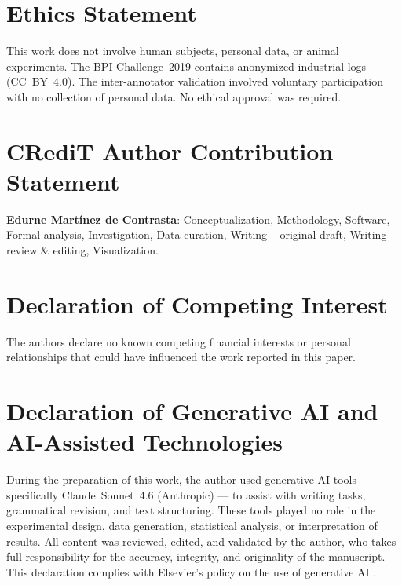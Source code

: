 \documentclass[preprint,12pt,numrefs]{elsarticle}
\begin{document}
\section*{Ethics Statement}
This work does not involve human subjects, personal data, or animal
experiments. The BPI Challenge~2019 contains anonymized industrial
logs (CC~BY~4.0). The inter-annotator validation involved voluntary
participation with no collection of personal data. No ethical approval
was required.

\section*{CRediT Author Contribution Statement}
\textbf{Edurne Martínez de Contrasta}: Conceptualization, Methodology,
Software, Formal analysis, Investigation, Data curation,
Writing -- original draft, Writing -- review \& editing, Visualization.

\section*{Declaration of Competing Interest}
The authors declare no known competing financial interests or personal
relationships that could have influenced the work reported in this paper.

\section*{Declaration of Generative AI and AI-Assisted Technologies}
During the preparation of this work, the author used generative AI
tools --- specifically Claude~Sonnet~4.6 (Anthropic) --- to assist
with writing tasks, grammatical revision, and text structuring. These
tools played no role in the experimental design, data generation,
statistical analysis, or interpretation of results. All content was
reviewed, edited, and validated by the author, who takes full
responsibility for the accuracy, integrity, and originality of the
manuscript. This declaration complies with Elsevier's policy on the
use of generative AI \citep{Elsevier2025ai}.
\end{document}
